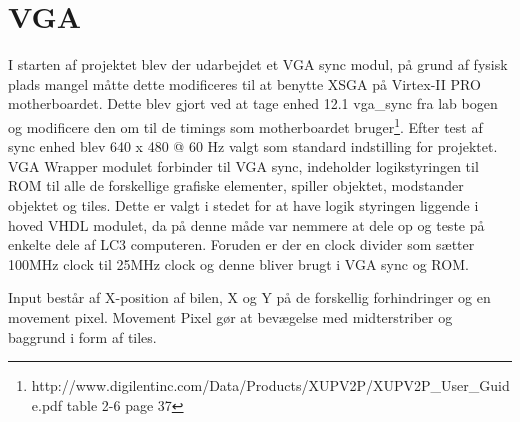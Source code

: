 \section{VGA}
I starten af projektet blev der udarbejdet et VGA sync modul, på grund af fysisk plads mangel måtte dette modificeres til at benytte XSGA på Virtex-II PRO motherboardet. Dette blev gjort ved at tage enhed 12.1 vga\_sync fra lab bogen~\cite{chu} og modificere den om til de timings som motherboardet bruger\footnote{http://www.digilentinc.com/Data/Products/XUPV2P/XUPV2P\_User\_Guide.pdf table 2-6 page 37}.
Efter test af sync enhed blev 640 x 480 @ 60 Hz valgt som standard indstilling for projektet.
VGA Wrapper modulet forbinder til VGA sync, indeholder logikstyringen til ROM til alle de forskellige grafiske elementer, spiller objektet, modstander objektet og tiles. Dette er valgt i stedet for at have logik styringen liggende i hoved VHDL modulet, da på denne måde var nemmere at dele op og teste på enkelte dele af LC3 computeren. Foruden er der en clock divider som sætter 100MHz clock til 25MHz clock og denne bliver brugt i VGA sync og ROM. 

Input består af X-position af bilen, X og Y på de forskellig forhindringer og en movement pixel. Movement Pixel gør at bevægelse med midterstriber og baggrund i form af tiles.

